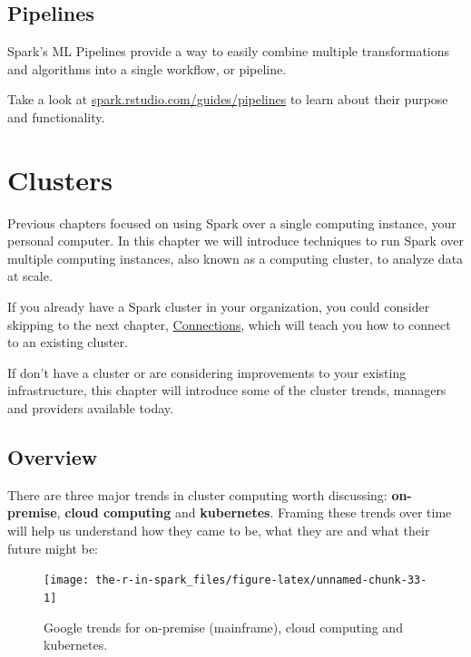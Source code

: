 \documentclass[]{book}
\theoremstyle{definition}
\theoremstyle{definition}
\theoremstyle{definition}
\theoremstyle{remark}
\begin{document}
\hypertarget{pipelines}{%
\section{Pipelines}\label{pipelines}}

Spark's ML Pipelines provide a way to easily combine multiple
transformations and algorithms into a single workflow, or pipeline.

Take a look at
\href{http://spark.rstudio.com/guides/pipelines/}{spark.rstudio.com/guides/pipelines}
to learn about their purpose and functionality.

\hypertarget{clusters}{%
\chapter{Clusters}\label{clusters}}

Previous chapters focused on using Spark over a single computing
instance, your personal computer. In this chapter we will introduce
techniques to run Spark over multiple computing instances, also known as
a computing cluster, to analyze data at scale.

If you already have a Spark cluster in your organization, you could
consider skipping to the next chapter,
\protect\hyperlink{connections-1}{Connections}, which will teach you how
to connect to an existing cluster.

If don't have a cluster or are considering improvements to your existing
infrastructure, this chapter will introduce some of the cluster trends,
managers and providers available today.

\hypertarget{overview-1}{%
\section{Overview}\label{overview-1}}

There are three major trends in cluster computing worth discussing:
\textbf{on-premise}, \textbf{cloud computing} and \textbf{kubernetes}.
Framing these trends over time will help us understand how they came to
be, what they are and what their future might be:

\begin{figure}

{\centering \texttt{[image: the-r-in-spark\_files/figure-latex/unnamed-chunk-33-1]} 

}

\caption{Google trends for on-premise (mainframe), cloud computing and kubernetes.}\label{fig:unnamed-chunk-33}
\end{figure}
\end{document}
